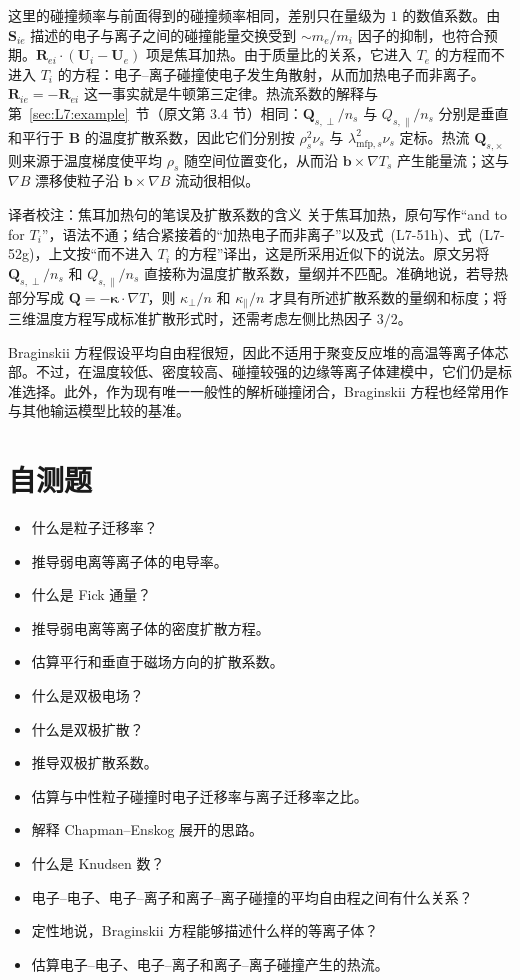 这里的碰撞频率与前面得到的碰撞频率相同，差别只在量级为 $1$ 的数值系数。由 $\boldsymbol S_{ie}$ 描述的电子与离子之间的碰撞能量交换受到 $\sim m_e/m_i$ 因子的抑制，也符合预期。$\boldsymbol R_{ei}\cdot(\boldsymbol U_i-\boldsymbol U_e)$ 项是焦耳加热。由于质量比的关系，它进入 $T_e$ 的方程而不进入 $T_i$ 的方程：电子--离子碰撞使电子发生角散射，从而加热电子而非离子。$\boldsymbol R_{ie}=-\boldsymbol R_{ei}$ 这一事实就是牛顿第三定律。热流系数的解释与第~\ref{sec:L7:example}~节（原文第 3.4 节）相同：$\boldsymbol Q_{s,\perp}/n_s$ 与 $Q_{s,\parallel}/n_s$ 分别是垂直和平行于 $\boldsymbol B$ 的温度扩散系数，因此它们分别按 $\rho_s^2\nu_s$ 与 $\lambda_{\mathrm{mfp},s}^2\nu_s$ 定标。热流 $\boldsymbol Q_{s,\times}$ 则来源于温度梯度使平均 $\rho_s$ 随空间位置变化，从而沿 $\boldsymbol b\times\nabla T_s$ 产生能量流；这与 $\nabla B$ 漂移使粒子沿 $\boldsymbol b\times\nabla B$ 流动很相似。
\begin{correction}{译者校注：焦耳加热句的笔误及扩散系数的含义}
关于焦耳加热，原句写作“and to for $T_i$”，语法不通；结合紧接着的“加热电子而非离子”以及式~(L7-51h)、式~(L7-52g)，上文按“而不进入 $T_i$ 的方程”译出，这是所采用近似下的说法。原文另将 $\boldsymbol Q_{s,\perp}/n_s$ 和 $Q_{s,\parallel}/n_s$ 直接称为温度扩散系数，量纲并不匹配。准确地说，若导热部分写成 $\boldsymbol Q=-\boldsymbol\kappa\cdot\nabla T$，则 $\kappa_\perp/n$ 和 $\kappa_\parallel/n$ 才具有所述扩散系数的量纲和标度；将三维温度方程写成标准扩散形式时，还需考虑左侧比热因子 $3/2$。
\end{correction}
Braginskii 方程假设平均自由程很短，因此不适用于聚变反应堆的高温等离子体芯部。不过，在温度较低、密度较高、碰撞较强的边缘等离子体建模中，它们仍是标准选择。此外，作为现有唯一一般性的解析碰撞闭合，Braginskii 方程也经常用作与其他输运模型比较的基准。
\section*{自测题}
\begin{itemize}
\item 什么是粒子迁移率？
\item 推导弱电离等离子体的电导率。
\item 什么是 Fick 通量？
\item 推导弱电离等离子体的密度扩散方程。
\item 估算平行和垂直于磁场方向的扩散系数。
\item 什么是双极电场？
\item 什么是双极扩散？
\item 推导双极扩散系数。
\item 估算与中性粒子碰撞时电子迁移率与离子迁移率之比。
\item 解释 Chapman--Enskog 展开的思路。
\item 什么是 Knudsen 数？
\item 电子--电子、电子--离子和离子--离子碰撞的平均自由程之间有什么关系？
\item 定性地说，Braginskii 方程能够描述什么样的等离子体？
\item 估算电子--电子、电子--离子和离子--离子碰撞产生的热流。
\end{itemize}
